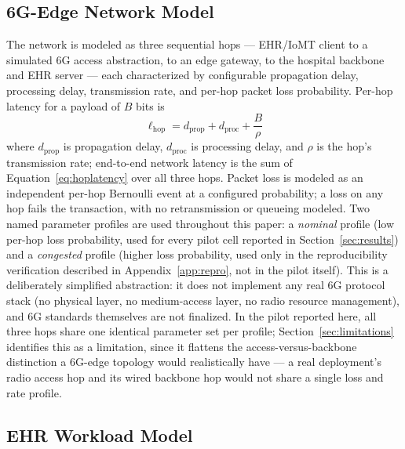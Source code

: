 \documentclass[journal]{IEEEtran}
\begin{document}
\subsection{6G-Edge Network Model}
\label{sec:sixg}

The network is modeled as three sequential hops --- EHR/IoMT client to a simulated 6G access abstraction, to an edge gateway, to the hospital backbone and EHR server --- each characterized by configurable propagation delay, processing delay, transmission rate, and per-hop packet loss probability. Per-hop latency for a payload of $B$ bits is
\begin{equation}
\ell_{\text{hop}} = d_{\text{prop}} + d_{\text{proc}} + \frac{B}{\rho}
\label{eq:hoplatency}
\end{equation}
where $d_{\text{prop}}$ is propagation delay, $d_{\text{proc}}$ is processing delay, and $\rho$ is the hop's transmission rate; end-to-end network latency is the sum of Equation~\eqref{eq:hoplatency} over all three hops. Packet loss is modeled as an independent per-hop Bernoulli event at a configured probability; a loss on any hop fails the transaction, with no retransmission or queueing modeled. Two named parameter profiles are used throughout this paper: a \emph{nominal} profile (low per-hop loss probability, used for every pilot cell reported in Section~\ref{sec:results}) and a \emph{congested} profile (higher loss probability, used only in the reproducibility verification described in Appendix~\ref{app:repro}, not in the pilot itself). This is a deliberately simplified abstraction: it does not implement any real 6G protocol stack (no physical layer, no medium-access layer, no radio resource management), and 6G standards themselves are not finalized. In the pilot reported here, all three hops share one identical parameter set per profile; Section~\ref{sec:limitations} identifies this as a limitation, since it flattens the access-versus-backbone distinction a 6G-edge topology would realistically have --- a real deployment's radio access hop and its wired backbone hop would not share a single loss and rate profile.

\subsection{EHR Workload Model}
\label{sec:workload}
\end{document}
